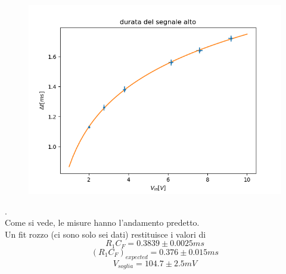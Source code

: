 \documentclass[10pt,a4paper]{article}
\begin{document}
\begin{figure}[h] \centering
	\includegraphics[scale=0.7]{Figure_1.png}
\end{figure}.\\
Come si vede, le misure hanno l'andamento predetto. \\Un fit rozzo (ci sono solo sei dati) restituisce i valori di \[R_1 C_F=0.3839 \pm0.0025 ms \] \[(R_1 C_F)_{expected}=0.376\pm0.015 ms\] 
\[V_{soglia}=104.7\pm2.5 mV\]
\end{document}
